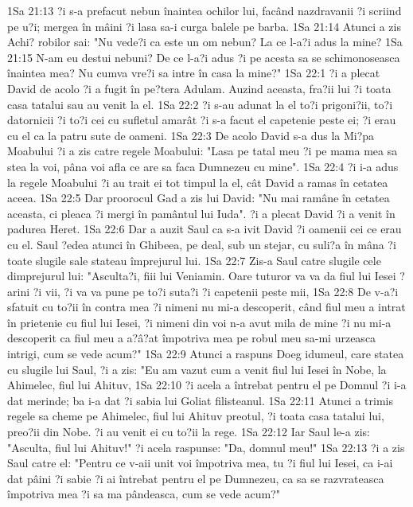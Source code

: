 1Sa 21:13  ?i s-a prefacut nebun înaintea ochilor lui, facând nazdravanii ?i scriind pe u?i; mergea în mâini ?i lasa sa-i curga balele pe barba.
1Sa 21:14  Atunci a zis Achi? robilor sai: "Nu vede?i ca este un om nebun? La ce l-a?i adus la mine?
1Sa 21:15  N-am eu destui nebuni? De ce l-a?i adus ?i pe acesta sa se schimonoseasca înaintea mea? Nu cumva vre?i sa intre în casa la mine?"
1Sa 22:1  ?i a plecat David de acolo ?i a fugit în pe?tera Adulam. Auzind aceasta, fra?ii lui ?i toata casa tatalui sau au venit la el.
1Sa 22:2  ?i s-au adunat la el to?i prigoni?ii, to?i datornicii ?i to?i cei cu sufletul amarât ?i s-a facut el capetenie peste ei; ?i erau cu el ca la patru sute de oameni.
1Sa 22:3  De acolo David s-a dus la Mi?pa Moabului ?i a zis catre regele Moabului: "Lasa pe tatal meu ?i pe mama mea sa stea la voi, pâna voi afla ce are sa faca Dumnezeu cu mine".
1Sa 22:4  ?i i-a adus la regele Moabului ?i au trait ei tot timpul la el, cât David a ramas în cetatea aceea.
1Sa 22:5  Dar proorocul Gad a zis lui David: "Nu mai ramâne în cetatea aceasta, ci pleaca ?i mergi în pamântul lui Iuda". ?i a plecat David ?i a venit în padurea Heret.
1Sa 22:6  Dar a auzit Saul ca s-a ivit David ?i oamenii cei ce erau cu el. Saul ?edea atunci în Ghibeea, pe deal, sub un stejar, cu suli?a în mâna ?i toate slugile sale stateau împrejurul lui.
1Sa 22:7  Zis-a Saul catre slugile cele dimprejurul lui: "Asculta?i, fiii lui Veniamin. Oare tuturor va va da fiul lui Iesei ?arini ?i vii, ?i va va pune pe to?i suta?i ?i capetenii peste mii,
1Sa 22:8  De v-a?i sfatuit cu to?ii în contra mea ?i nimeni nu mi-a descoperit, când fiul meu a intrat în prietenie cu fiul lui Iesei, ?i nimeni din voi n-a avut mila de mine ?i nu mi-a descoperit ca fiul meu a a?â?at împotriva mea pe robul meu sa-mi urzeasca intrigi, cum se vede acum?"
1Sa 22:9  Atunci a raspuns Doeg idumeul, care statea cu slugile lui Saul, ?i a zis: "Eu am vazut cum a venit fiul lui Iesei în Nobe, la Ahimelec, fiul lui Ahituv,
1Sa 22:10  ?i acela a întrebat pentru el pe Domnul ?i i-a dat merinde; ba i-a dat ?i sabia lui Goliat filisteanul.
1Sa 22:11  Atunci a trimis regele sa cheme pe Ahimelec, fiul lui Ahituv preotul, ?i toata casa tatalui lui, preo?ii din Nobe. ?i au venit ei cu to?ii la rege.
1Sa 22:12  Iar Saul le-a zis: "Asculta, fiul lui Ahituv!" ?i acela raspunse: "Da, domnul meu!"
1Sa 22:13  ?i a zis Saul catre el: "Pentru ce v-aii unit voi împotriva mea, tu ?i fiul lui Iesei, ca i-ai dat pâini ?i sabie ?i ai întrebat pentru el pe Dumnezeu, ca sa se razvrateasca împotriva mea ?i sa ma pândeasca, cum se vede acum?"
